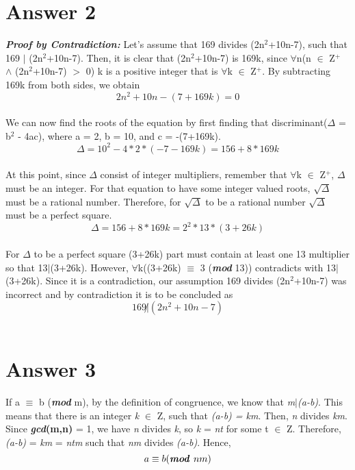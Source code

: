 \documentclass[12pt]{article}
\begin{document}
\section*{Answer 2}
\textbf{\textit{Proof by Contradiction:} }Let's assume that 169 divides (2n$^2$+10n-7), such that 169 $\mid$ (2n$^2$+10n-7). Then, it is clear that (2n$^2$+10n-7) is 169k, since $\forall$n(n $\in$ Z$^+$ $\wedge$ (2n$^2$+10n-7) $>$ 0) k is a positive integer that is $\forall$k $\in$ Z$^+$. By subtracting 169k from both sides, we obtain \\
\[2n^2+10n-(7+169k) = 0\]\\
We can now find the roots of the equation by first finding that discriminant($\Delta$ = b$^2$ - 4ac), where a = 2, b = 10, and c = -(7+169k).\\
\[\Delta = 10^2 - 4*2*(-7-169k) = 156 + 8*169k\]\\
At this point, since $\Delta$ consist of integer multipliers, remember that $\forall$k $\in$ Z$^+$, $\Delta$ must be an integer. For that equation to have some integer valued roots, $\sqrt{\Delta}$ must be a rational number. Therefore, for $\sqrt{\Delta}$ to be a rational number $\sqrt{\Delta}$ must be a perfect square. \\
\[\Delta = 156 + 8*169k = 2^2*13*(3+26k)  \]\\
For $\Delta$ to be a perfect square (3+26k) part must contain at least one 13 multiplier so that 13$\mid$(3+26k). However, $\forall$k((3+26k) $\equiv$ 3 (\textbf{\textit{mod}} 13)) contradicts with 13$\mid$(3+26k). Since it is a contradiction, our assumption 169 divides (2n$^2$+10n-7) was incorrect and by contradiction it is to be concluded as \\
\[169\not| (2n^2 + 10n - 7)\]\\
\section*{Answer 3}
If a $\equiv$ b (\textbf{\textit{mod} } m), by the definition of congruence, we know that \textit{m$\mid$(a-b)}. This means that there is an integer \textit{k} $\in$ Z, such that \textit{(a-b) = km}.  Then, \textit{n} divides \textit{km}. Since \textbf{\textit{gcd}(m,n)} = 1, we have \textit{n} divides \textit{k}, so \textit{k} = \textit{nt} for some t $\in$ Z. Therefore, \textit{(a-b)} = \textit{km} = \textit{ntm} such that \textit{nm} divides \textit{(a-b)}. Hence,  \\
\hspace*{1cm} \[a \equiv b (\textbf{\textit{mod} } nm)\] \\
\end{document}
